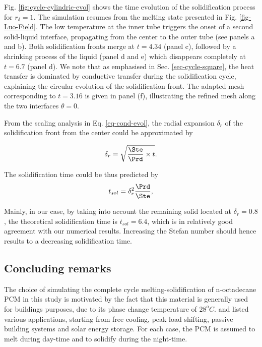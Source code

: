 Fig. \ref{fig:cycle-cylindric-evol} shows the time evolution of the solidification process for $r_{\delta} = 1$.
The simulation resumes from the melting state presented in Fig. \ref{fig-Luo-Field}.
The low temperature at the inner tube triggers the onset of a second solid-liquid interface, propagating from the center to the outer tube (see panels a and b).
Both solidification fronts merge  at $t = 4.34$ (panel c), followed by a shrinking process of the liquid (panel d and e) which disappears completely at $t = 6.7$ (panel d).
We note that as emphasised in Sec. \ref{sec-cycle-square}, the heat transfer is dominated by conductive transfer during the solidification cycle, explaining the circular evolution of the solidification front.
The adapted mesh corresponding to $t = 3.16$ is given in panel (f), illustrating the refined mesh along the two interfaces $\theta = 0$.

From the scaling analysis in Eq. \ref{eq-cond-evol}, the radial expansion $\delta_r$ of the solidification front from the center could be approximated by

\begin{equation}
	\delta_r = \sqrt{\frac{\Ste}{\Prd}\times t}.
\end{equation}

\noindent The solidification time could be thus predicted by
\begin{equation}
	t_{sol} = \delta_r^2 \frac{\Prd}{\Ste},
\end{equation}

\noindent Mainly, in our case, by taking into account the remaining solid located at $\delta_r = 0.8$, the theoretical solidification time is $t_{sol} = 6.4$, which is in relatively good agreement with our numerical results.
Increasing the Stefan number should hence results to a decreasing solidification time.


\subsection{Concluding remarks}
The choice of simulating the complete cycle melting-solidification of n-octadecane PCM in this study is motivated by the fact that this material is generally used for buildings purposes, due to its phase change temperature of  $28^{o}C$.
\cite{zhu2009dynamic} and \cite{kalnaes2015phase} listed various applications, starting from free cooling, peak load shifting, passive building systems and solar energy storage.
For each case, the PCM is assumed to melt during day-time and to solidify during the night-time.

